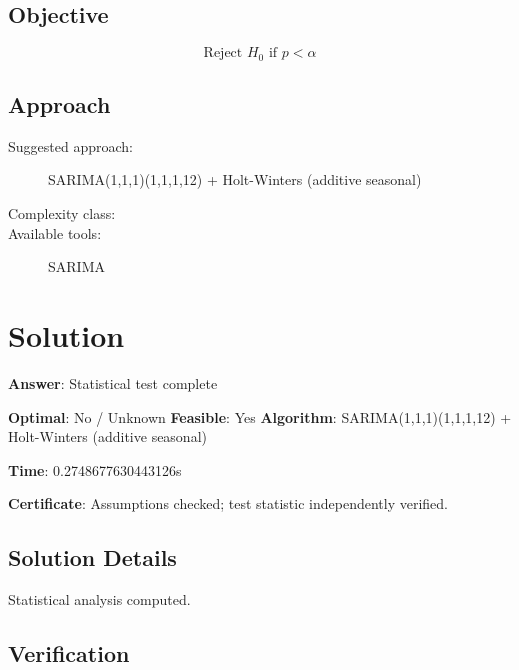 \documentclass[11pt, a4paper]{article}
\begin{document}
\subsection{Objective}

\begin{equation}
\text{Reject } H_0 \text{ if } p < \alpha
\end{equation}

\subsection{Approach}

\begin{description}
  \item[Suggested approach:] SARIMA(1,1,1)(1,1,1,12) + Holt-Winters (additive seasonal)
  \item[Complexity class:] 
  \item[Available tools:] SARIMA
\end{description}
\section{Solution}

\begin{polyaresult}

\textbf{Answer}: Statistical test complete


\textbf{Optimal}: No / Unknown \hfill
\textbf{Feasible}: Yes
\textbf{Algorithm}: SARIMA(1,1,1)(1,1,1,12) + Holt-Winters (additive seasonal) \quad $$

\textbf{Time}: 0.2748677630443126s

\textbf{Certificate}: Assumptions checked; test statistic independently verified.

\end{polyaresult}

\subsection{Solution Details}

Statistical analysis computed.

\subsection{Verification}
\end{document}
